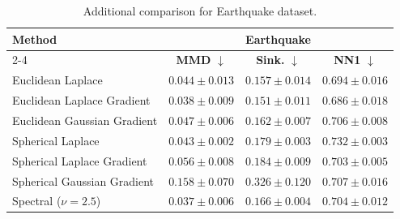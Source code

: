 \documentclass{article}
\theoremstyle{plain}
\newcommand{\best}[1]{\cellcolor{bestblue}#1}
\newcommand{\second}[1]{\cellcolor{secondblue}#1}
\newcommand{\third}[1]{\cellcolor{thirdgrayblue}#1}
\begin{document}
\begin{table}[h!]
\centering
\small
\setlength{\tabcolsep}{6pt}
\renewcommand{\arraystretch}{1.15}
\begin{tabular}{lccc}
\toprule
\textbf{Method} 
& \multicolumn{3}{c}{\textbf{Earthquake}} \\
\cmidrule(lr){2-4} 
& \textbf{MMD} $\downarrow$ & \textbf{Sink.} $\downarrow$ & \textbf{NN1} $\downarrow$\\
\midrule
Euclidean Laplace {\tiny \cite{Deng_2026_Drift}}
& $0.044 \pm 0.013$ & \second{$0.157 \pm 0.014$} & \second{$0.694 \pm 0.016$} \\
\midrule
Euclidean Laplace Gradient
& \second{$0.038 \pm 0.009$} & \best{$0.151 \pm 0.011$} & \best{$0.686 \pm 0.018$}\\
Euclidean Gaussian Gradient
& $0.047 \pm 0.006$ & \third{$0.162 \pm 0.007$} & $0.706 \pm 0.008$ \\
Spherical Laplace
& {$0.043 \pm 0.002$} & $0.179 \pm 0.003$ & $0.732 \pm 0.003$ \\
Spherical Laplace Gradient
& $0.056 \pm 0.008$ & $0.184 \pm 0.009$ & \third{$0.703 \pm 0.005$} \\
Spherical Gaussian Gradient
& $0.158 \pm 0.070$ & $0.326 \pm 0.120$ & $0.707 \pm 0.016$ \\
Spectral ($\nu = 2.5$)
& \best{$0.037 \pm 0.006$} & $0.166 \pm 0.004$ & $0.704 \pm 0.012$ \\
\bottomrule
\end{tabular}
\caption{Additional comparison for Earthquake dataset.
}
\label{tab:earthquake-full}
\end{table}
\end{document}
